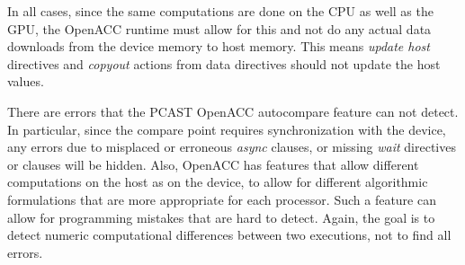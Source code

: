 In all cases, since the same computations are done on the CPU as well as the GPU, the OpenACC runtime must allow for this and not do any actual data downloads from the device memory to host memory.
This means \emph{update host} directives and \emph{copyout} actions from data directives should not update the host values.

There are errors that the PCAST OpenACC autocompare feature can not detect.
In particular, since the compare point requires synchronization with the device, any errors due to misplaced or erroneous \emph{async} clauses, or missing \emph{wait} directives or clauses will be hidden.
Also, OpenACC has features that allow different computations on the host as on the device, to allow for different algorithmic formulations that are more appropriate for each processor.
Such a feature can allow for programming mistakes that are hard to detect.
Again, the goal is to detect numeric computational differences between two executions, not to find all errors.
